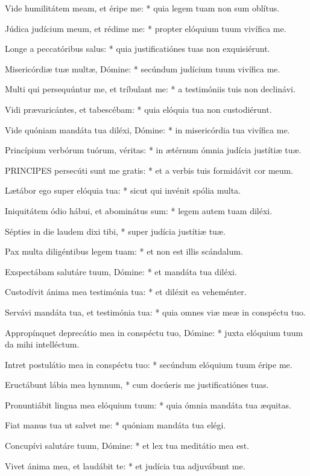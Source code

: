 Vide humilitátem meam, et éripe me: * quia legem tuam non sum oblítus.

Júdica judícium meum, et rédime me: * propter elóquium tuum vivífica me.

Longe a peccatóribus salus: * quia justificatiónes tuas non exquisiérunt.

Misericórdiæ tuæ multæ, Dómine: * secúndum judícium tuum vivífica me.

Multi qui persequúntur me, et tríbulant me: * a testimóniis tuis non declinávi.

Vidi prævaricántes, et tabescébam: * quia elóquia tua non custodiérunt.

Vide quóniam mandáta tua diléxi, Dómine: * in misericórdia tua vivífica me.

Princípium verbórum tuórum, véritas: * in ætérnum ómnia judícia justítiæ tuæ.


\lettrine[lines=2]{P}{RINCIPES} persecúti sunt me gratis: * et a verbis tuis formidávit cor meum.

Lætábor ego super elóquia tua: * sicut qui invénit spólia multa.

Iniquitátem ódio hábui, et abominátus sum: * legem autem tuam diléxi.

Sépties in die laudem dixi tibi, * super judícia justítiæ tuæ.

Pax multa diligéntibus legem tuam: * et non est illis scándalum.

Exspectábam salutáre tuum, Dómine: * et mandáta tua diléxi.

Custodívit ánima mea testimónia tua: * et diléxit ea veheménter.

Servávi mandáta tua, et testimónia tua: * quia omnes viæ meæ in conspéctu tuo.

Appropínquet deprecátio mea in conspéctu tuo, Dómine: * juxta elóquium tuum da mihi intelléctum.

Intret postulátio mea in conspéctu tuo: * secúndum elóquium tuum éripe me.

Eructábunt lábia mea hymnum, * cum docúeris me justificatiónes tuas.

Pronuntiábit lingua mea elóquium tuum: * quia ómnia mandáta tua æquitas.

Fiat manus tua ut salvet me: * quóniam mandáta tua elégi.

Concupívi salutáre tuum, Dómine: * et lex tua meditátio mea est.

Vivet ánima mea, et laudábit te: * et judícia tua adjuvábunt me.

